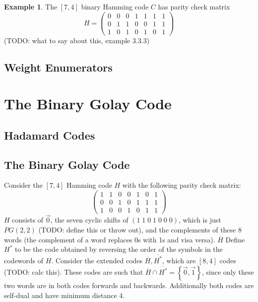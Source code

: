 \documentclass{article}
\newcommand{\ext}[1]{\overline{#1}}
\renewcommand{\=}{\equiv}
\newcommand{\set}[1]{\left\{ #1 \right\}}
\renewcommand{\v}{\vec}
\theoremstyle{plain}
\theoremstyle{definition}
\newtheorem{exmp}{Example}[subsection]
\newcommand{\TODO}[1]{(TODO: #1)}
\begin{document}
\begin{exmp}
The $[7,4]$ binary Hamming code $C$ has parity check matrix
$$ H = \begin{pmatrix}
  0 & 0 & 0 & 1 & 1 & 1 & 1 \\
  0 & 1 & 1 & 0 & 0 & 1 & 1 \\
  1 & 0 & 1 & 0 & 1 & 0 & 1
\end{pmatrix} $$
\TODO{what to say about this, example 3.3.3}
\end{exmp}


\subsection{Weight Enumerators}

\section{The Binary Golay Code}

\subsection{Hadamard Codes}

\subsection{The Binary Golay Code}

Consider the $[7,4]$ Hamming code $H$ with the following parity check matrix:
$$ \begin{pmatrix}
  1 & 1 & 0 & 0 & 1 & 0 & 1 \\
  0 & 0 & 1 & 0 & 1 & 1 & 1 \\
  1 & 0 & 0 & 1 & 0 & 1 & 1
\end{pmatrix} $$
$H$ consists of $\v 0$, the seven cyclic shifts of $(1\;1\;0\;1\;0\;0\;0)$, which is just $PG(2,2)$ \TODO{define this or throw out}, and the complements of these 8 words (the complement of a word replaces 0s with 1s and visa versa).
$\ext{H}$
Define $H^*$ to be the code obtained by reversing the order of the symbols in the codewords of $H$.
Consider the extended codes $\ext{H}, \ext{H^*}$, which are $[8,4]$ codes \TODO{calc this}.
These codes are such that $\ext{H} \cap \ext{H^*} = \set{ \v 0, \v 1 }$, since only these two words are in both codes forwards and backwards. Additionally both codes are self-dual and have minimum distance 4.
\end{document}

